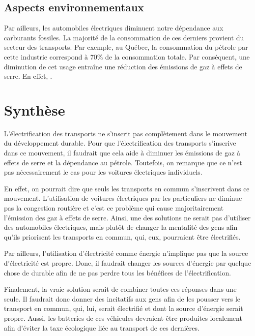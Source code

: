 \subsection{Aspects environnementaux}

Par ailleurs, les automobiles électriques diminuent notre dépendance aux carburants fossiles. La majorité de la consommation de ces derniers provient du secteur des transports. Par exemple, au Québec, la consommation du pétrole par cette industrie correspond à 70\% de la consommation totale. Par conséquent, une diminution de cet usage entraîne une réduction des émissions de gaz à effets de serre. En effet, .

\section{Synthèse}

L'électrification des transports ne s'inscrit pas complètement dans le mouvement du développement durable. Pour que l'électrification des transports s'inscrive dans ce mouvement, il faudrait que cela aide à diminuer les émissions de gaz à effets de serre et la dépendance au pétrole. Toutefois, on remarque que ce n'est pas nécessairement le cas pour les voitures électriques individuels.

En effet, on pourrait dire que seuls les transports en commun s'inscrivent dans ce mouvement. L'utilisation de voitures électriques par les particuliers ne diminue pas la congestion routière et c'est ce problème qui cause majoritairement l'émission des gaz à effets de serre. Ainsi, une des solutions ne serait pas d'utiliser des automobiles électriques, mais plutôt de changer la mentalité des gens afin qu'ils priorisent les transports en commun, qui, eux, pourraient être électrifiés. 

Par ailleurs, l'utilisation d'électricité comme énergie n'implique pas que la source d'électricité est propre. Donc, il faudrait changer les sources d'énergie par quelque chose de durable afin de ne pas perdre tous les bénéfices de l'électrification. 

Finalement, la vraie solution serait de combiner toutes ces réponses dans une seule. Il faudrait donc donner des incitatifs aux gens afin de les pousser vers le transport en commun, qui, lui, serait électrifié et dont la source d'énergie serait propre. Aussi, les batteries de ces véhicules devraient être produites localement afin d'éviter la taxe écologique liée au transport de ces dernières.
